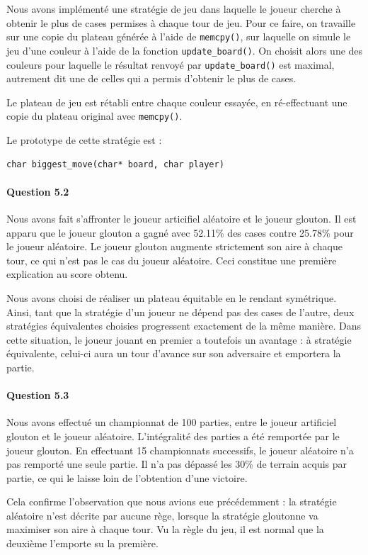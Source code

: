 \documentclass[a4paper]{article}
\begin{document}
    Nous avons implémenté une stratégie de jeu dans laquelle le joueur cherche 
à obtenir le plus de cases permises à chaque tour de jeu. Pour ce faire, on 
travaille sur une copie du plateau générée à l'aide de \texttt{memcpy()}, sur 
laquelle on simule le jeu d'une couleur à l'aide de la fonction 
\texttt{update\_board()}. On choisit alors une des couleurs pour laquelle le 
résultat renvoyé par \texttt{update\_board()} est maximal, autrement dit une de 
celles qui a permis d'obtenir le plus de cases.

Le plateau de jeu est rétabli entre chaque couleur essayée, en ré-effectuant 
une copie du plateau original avec \texttt{memcpy()}.

Le prototype de cette stratégie est : 
\begin{lstlisting}
char biggest_move(char* board, char player)
\end{lstlisting}

    \paragraph{Question 5.2}
    Nous avons fait s'affronter le joueur articifiel aléatoire et le joueur 
glouton. Il est apparu que le joueur glouton a gagné avec 52.11\% des cases 
contre 25.78\% pour le joueur aléatoire. Le joueur glouton augmente strictement 
son aire à chaque tour, ce qui n'est pas le cas du joueur aléatoire. 
Ceci constitue une première explication au score obtenu.

Nous avons choisi de réaliser un plateau équitable en le rendant symétrique. 
Ainsi, tant que la stratégie d'un joueur ne dépend pas des cases de l'autre, 
deux stratégies équivalentes choisies progressent exactement de la même 
manière. Dans cette situation, le joueur jouant en premier a toutefois un 
avantage : à stratégie équivalente, celui-ci aura un tour d'avance sur son 
adversaire et emportera la partie.
    \paragraph{Question 5.3}
    Nous avons effectué un championnat de 100 parties, entre le joueur 
artificiel glouton et le joueur aléatoire. L'intégralité des parties a été 
remportée par le joueur glouton. En effectuant 15 championnats successifs, le 
joueur aléatoire n'a pas remporté une seule partie. Il n'a pas dépassé les 30\% 
de terrain acquis par partie, ce qui le laisse loin de l'obtention d'une 
victoire.

Cela confirme l'observation que nous avions eue précédemment : la stratégie 
aléatoire n'est décrite par aucune rège, lorsque la stratégie gloutonne va 
maximiser son aire à chaque tour. Vu la règle du jeu, il est normal que la 
deuxième l'emporte su la première.
\end{document}
